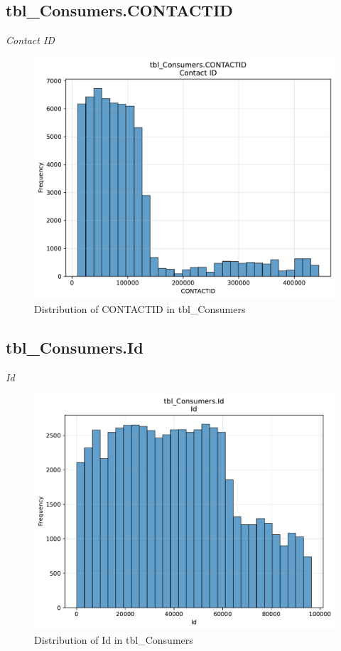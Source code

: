 \subsection{tbl\_Consumers.CONTACTID}
\textit{Contact ID}

\begin{figure}[htbp]
\centering
\includegraphics[width=\textwidth]{figures/dbo_tbl_Consumers_CONTACTID.pdf}
\caption{Distribution of CONTACTID in tbl\_Consumers}
\end{figure}\newpage

\subsection{tbl\_Consumers.Id}
\textit{Id}

\begin{figure}[htbp]
\centering
\includegraphics[width=\textwidth]{figures/dbo_tbl_Consumers_Id.pdf}
\caption{Distribution of Id in tbl\_Consumers}
\end{figure}\newpage

